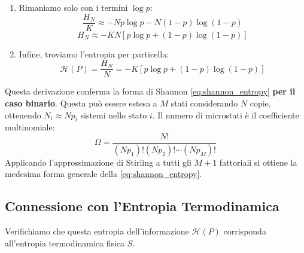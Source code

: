 \begin{enumerate}
\begin{enumerate}
    $N \log N - Np \log N - N(1-p) \log N = N \log N \left( 1 - p - (1-p) \right) = N \log N (0) = 0$
    \item Rimaniamo solo con i termini $\log p$:
    $$ \frac{H_N}{K} \approx -Np \log p - N(1-p) \log(1-p) $$
    $$ H_N \approx -KN \left[ p \log p + (1-p) \log(1-p) \right] $$
    \item Infine, troviamo l'entropia per particella:
    \begin{equation}
        \mathcal{H}(P) = \frac{H_N}{N} = -K \left[ p \log p + (1-p) \log(1-p) \right]
        \label{eq:shannon_binary}
    \end{equation}
\end{enumerate}
Questa derivazione conferma la forma di Shannon \eqref{eq:shannon_entropy} \textbf{per il caso binario}. Questa può essere estesa a $M$ stati considerando $N$ copie, ottenendo $N_i \approx N p_i$ sistemi nello stato $i$. Il numero di microstati è il coefficiente multinomiale:
$$ \Omega = \frac{N!}{(Np_1)! (Np_2)! \cdots (Np_M)!} $$
Applicando l'approssimazione di Stirling a tutti gli $M+1$ fattoriali si ottiene la medesima forma generale della \eqref{eq:shannon_entropy}.

\subsection{Connessione con l'Entropia Termodinamica}
Verifichiamo che questa entropia dell'informazione $\mathcal{H}(P)$ corrisponda all'entropia termodinamica fisica $S$.


\end{enumerate}

